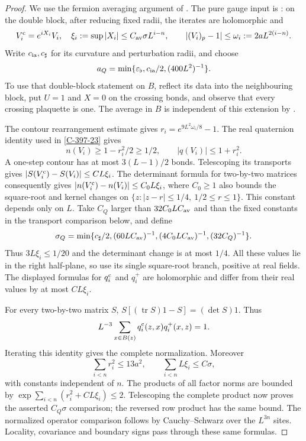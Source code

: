 \documentclass[11pt,letterpaper,reqno]{amsart}
\theoremstyle{definition}
\theoremstyle{remark}
\begin{document}
\begin{proof}
We use the fermion averaging argument of \cite{fermion-notes}.
The pure gauge input is \cite[equation (1063), p.~473]{YMM1}:
on the double block, after reducing fixed radii, the iterates
are holomorphic and
\[
 V_i^{\rm c}=e^{iX_i}V_i,\quad
 \xi_i:=\sup|X_i|\le C_{\rm av}\sigma L^{i-n},\qquad
 |(V_i)_p-1|\le\omega_i:=2aL^{2(i-n)}.
\]
Write $c_{\rm ia},c_\sharp$ for its curvature and perturbation
radii, and choose
\[
 a_Q=\min\{\varepsilon_\flat,c_{\rm ia}/2,(400L^2)^{-1}\}.
\]
To use that double-block statement on $B$, reflect its data
into the neighbouring block, put $U=1$ and $X=0$ on the
crossing bonds, and observe that every crossing plaquette is
one. The average in $B$ is independent of this extension by
\cite[Lemma~14.2]{YMM1}.

The contour rearrangement estimate gives
$r_i=e^{9L^2\omega_i/8}-1$. The real quaternion identity
used in \cref{C-397-23} gives
\[
 n(V_i)\ge1-r_i^2/2\ge1/2,\qquad |q(V_i)|\le1+r_i^2.
\]
A one-step contour has at most $3(L-1)/2$ bonds. Telescoping
its transports gives $|S(V_i^{\rm c})-S(V_i)|\le CL\xi_i$.
The determinant formula for two-by-two matrices consequently
gives $|n(V_i^{\rm c})-n(V_i)|\le C_0L\xi_i$, where
$C_0\ge1$ also bounds the square-root and kernel changes on
$\{z:|z-r|\le1/4,\ 1/2\le r\le1\}$. This constant depends
only on $L$. Take $C_Q$ larger than $32C_0LC_{\rm av}$ and
than the fixed constants in the transport comparison below,
and define
\[
 \sigma_Q=\min\{c_\sharp/2,(60LC_{\rm av})^{-1},
                   (4C_0LC_{\rm av})^{-1},(32C_Q)^{-1}\}.
\]
Thus $3L\xi_i\le1/20$ and the determinant change is at most
$1/4$. All these values lie in the right
half-plane, so use its single square-root branch, positive
at real fields. The displayed formulas for $q_i^{\rm c}$
and $q_i^+$ are holomorphic and differ from their real
values by at most $CL\xi_i$.

For every two-by-two matrix $S$,
$S[(\operatorname{tr}S)1-S]=(\det S)1$. Thus
\[
 L^{-3}\sum_{x\in B(z)}q_i^{\rm c}(z,x)q_i^+(x,z)=1.
\]
Iterating this identity gives the complete normalization.
Moreover
\[
 \sum_{i<n}r_i^2\le13a^2,\qquad
 \sum_{i<n}L\xi_i\le C\sigma,
\]
with constants independent of $n$. The products of all
factor norms are bounded by
$\exp\sum_{i<n}(r_i^2+CL\xi_i)\le2$.
Telescoping the complete product now proves the asserted
$C_Q\sigma$ comparison; the reversed row product has the
same bound. The normalized operator comparison follows by
Cauchy--Schwarz over the $L^{3n}$ sites. Locality, covariance
and boundary signs pass through these same formulas.


\end{proof}
\end{document}
